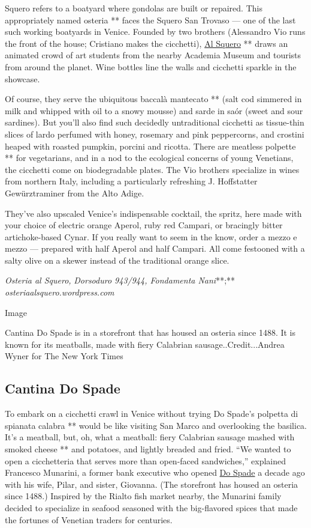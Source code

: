 Squero refers to a boatyard where gondolas are built or repaired. This
appropriately named osteria ** faces the Squero San Trovaso --- one of
the last such working boatyards in Venice. Founded by two brothers
(Alessandro Vio runs the front of the house; Cristiano makes the
cicchetti), \href{https://osteriaalsquero.wordpress.com/}{Al Squero} **
draws an animated crowd of art students from the nearby Academia Museum
and tourists from around the planet. Wine bottles line the walls and
cicchetti sparkle in the showcase.

Of course, they serve the ubiquitous baccalà mantecato ** (salt cod
simmered in milk and whipped with oil to a snowy mousse) and sarde in
saór (sweet and sour sardines). But you'll also find such decidedly
untraditional cicchetti as tissue-thin slices of lardo perfumed with
honey, rosemary and pink peppercorns, and crostini heaped with roasted
pumpkin, porcini and ricotta. There are meatless polpette ** for
vegetarians, and in a nod to the ecological concerns of young Venetians,
the cicchetti come on biodegradable plates. The Vio brothers specialize
in wines from northern Italy, including a particularly refreshing J.
Hoffstatter Gewürztraminer from the Alto Adige.

They've also upscaled Venice's indispensable cocktail, the spritz, here
made with your choice of electric orange Aperol, ruby red Campari, or
bracingly bitter artichoke-based Cynar. If you really want to seem in
the know, order a mezzo e mezzo --- prepared with half Aperol and half
Campari. All come festooned with a salty olive on a skewer instead of
the traditional orange slice.

\emph{Osteria al Squero,} \emph{Dorsoduro 943/944, Fondamenta Nani}**;**
\emph{osteriaalsquero.wordpress.com}

Image

Cantina Do Spade is in a storefront that has housed an osteria since
1488. It is known for its meatballs, made with fiery Calabrian
sausage..Credit...Andrea Wyner for The New York Times

\hypertarget{cantina-do-spade}{%
\subsection{Cantina Do Spade}\label{cantina-do-spade}}

To embark on a cicchetti crawl in Venice without trying Do Spade's
polpetta di spianata calabra ** would be like visiting San Marco and
overlooking the basilica. It's a meatball, but, oh, what a meatball:
fiery Calabrian sausage mashed with smoked cheese ** and potatoes, and
lightly breaded and fried. ``We wanted to open a cicchetteria that
serves more than open-faced sandwiches,'' explained Francesco Munarini,
a former bank executive who opened \href{https://cantinadospade.com/}{Do
Spade} a decade ago with his wife, Pilar, and sister, Giovanna. (The
storefront has housed an osteria since 1488.) Inspired by the Rialto
fish market nearby, the Munarini family decided to specialize in seafood
seasoned with the big-flavored spices that made the fortunes of Venetian
traders for centuries.

